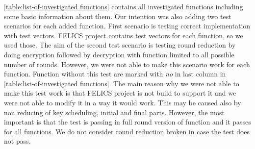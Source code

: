 \documentclass[
    digital,    %
    oneside,    %
    color,
    11pt,
    nocover,
    notable,
    nolof,
    nolot,
    final
]{fithesis3}
\begin{document}
\cref{table:list-of-investigated functions} contains all investigated functions including some basic information about them. Our intention was also adding two test scenarios for each added function. First scenario is testing correct implementation with test vectors. FELICS project contains test vectors for each function, so we used those. The aim of the second test scenario is testing round reduction by doing encryption followed by decryption with function limited to all possible number of rounds. However, we were not able to make this scenario work for each function. Function without this test are marked with \textit{no} in last column in \cref{table:list-of-investigated functions}. The main reason why we were not able to make this test work is that FELICS project is not build to support it and we were not able to modify it in a way it would work. This may be caused also by non reducing of key scheduling, initial and final parts. However, the most important is that the test is passing in full round version of function and it passes for all functions. We do not consider round reduction broken in case the test does not pass.
\end{document}
